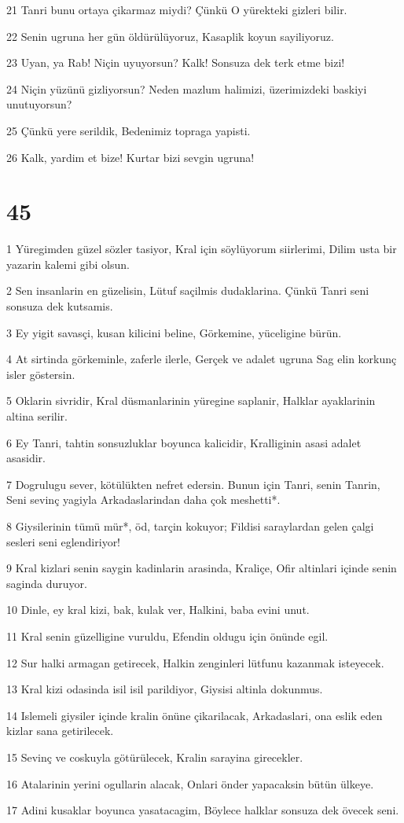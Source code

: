 \par 21 Tanri bunu ortaya çikarmaz miydi? Çünkü O yürekteki gizleri bilir.
\par 22 Senin ugruna her gün öldürülüyoruz, Kasaplik koyun sayiliyoruz.
\par 23 Uyan, ya Rab! Niçin uyuyorsun? Kalk! Sonsuza dek terk etme bizi!
\par 24 Niçin yüzünü gizliyorsun? Neden mazlum halimizi, üzerimizdeki baskiyi unutuyorsun?
\par 25 Çünkü yere serildik, Bedenimiz topraga yapisti.
\par 26 Kalk, yardim et bize! Kurtar bizi sevgin ugruna!

\chapter{45}

\par 1 Yüregimden güzel sözler tasiyor, Kral için söylüyorum siirlerimi, Dilim usta bir yazarin kalemi gibi olsun.
\par 2 Sen insanlarin en güzelisin, Lütuf saçilmis dudaklarina. Çünkü Tanri seni sonsuza dek kutsamis.
\par 3 Ey yigit savasçi, kusan kilicini beline, Görkemine, yüceligine bürün.
\par 4 At sirtinda görkeminle, zaferle ilerle, Gerçek ve adalet ugruna Sag elin korkunç isler göstersin.
\par 5 Oklarin sivridir, Kral düsmanlarinin yüregine saplanir, Halklar ayaklarinin altina serilir.
\par 6 Ey Tanri, tahtin sonsuzluklar boyunca kalicidir, Kralliginin asasi adalet asasidir.
\par 7 Dogrulugu sever, kötülükten nefret edersin. Bunun için Tanri, senin Tanrin, Seni sevinç yagiyla Arkadaslarindan daha çok meshetti*.
\par 8 Giysilerinin tümü mür*, öd, tarçin kokuyor; Fildisi saraylardan gelen çalgi sesleri seni eglendiriyor!
\par 9 Kral kizlari senin saygin kadinlarin arasinda, Kraliçe, Ofir altinlari içinde senin saginda duruyor.
\par 10 Dinle, ey kral kizi, bak, kulak ver, Halkini, baba evini unut.
\par 11 Kral senin güzelligine vuruldu, Efendin oldugu için önünde egil.
\par 12 Sur halki armagan getirecek, Halkin zenginleri lütfunu kazanmak isteyecek.
\par 13 Kral kizi odasinda isil isil parildiyor, Giysisi altinla dokunmus.
\par 14 Islemeli giysiler içinde kralin önüne çikarilacak, Arkadaslari, ona eslik eden kizlar sana getirilecek.
\par 15 Sevinç ve coskuyla götürülecek, Kralin sarayina girecekler.
\par 16 Atalarinin yerini ogullarin alacak, Onlari önder yapacaksin bütün ülkeye.
\par 17 Adini kusaklar boyunca yasatacagim, Böylece halklar sonsuza dek övecek seni.

